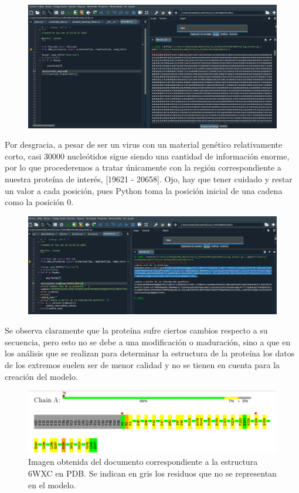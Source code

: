 \documentclass[12pt]{article}
\begin{document}
\begin{figure}[H]
\centering
\includegraphics[width=1.2\textwidth]{Screenshot_10}
\end{figure}
Por desgracia, a pesar de ser un virus con un material genético relativamente corto, casi 30000 nucleótidos sigue siendo una cantidad de información enorme, por lo que procederemos a tratar únicamente con la región correspondiente a nuestra proteína de interés, [19621 - 20658]. Ojo, hay que tener cuidado y restar un valor a cada posición, pues Python toma la posición inicial de una cadena como la posición 0.
\newline

\begin{figure}[H]
\centering
\includegraphics[width=1.2\textwidth]{Screenshot_5}
\end{figure}
Se observa claramente que la proteína sufre ciertos cambios respecto a su secuencia, pero esto no se debe a una modificación o maduración, sino a que en los análisis que se realizan para determinar la estructura de la proteína los datos de los extremos suelen ser de menor calidad y no se tienen en cuenta para la creación del modelo.
\newline

\begin{figure}[H]
\centering
\includegraphics[scale=0.6]{Screenshot_6}
\caption{Imagen obtenida del documento correspondiente a la estructura 6WXC en PDB. Se indican en gris los residuos que no se representan en el modelo.}
\end{figure}
\end{document}
